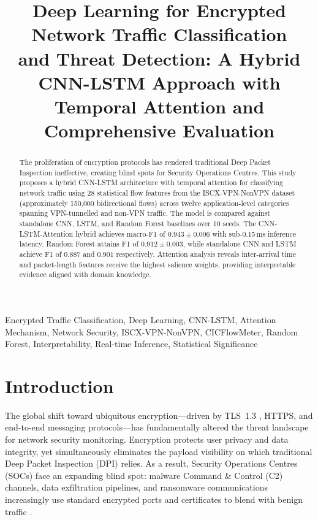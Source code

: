 \documentclass[conference]{IEEEtran}
\title{Deep Learning for Encrypted Network Traffic Classification\\
and Threat Detection: A Hybrid CNN-LSTM Approach with\\
Temporal Attention and Comprehensive Evaluation}
\author{
\IEEEauthorblockN{Avula Praveen Kumar}
\IEEEauthorblockA{Student ID: 24271730\\
H9AIMLC -- AI/ML in Cybersecurity\\
National College of Ireland\\
Dublin, Ireland\\
\texttt{24271730@student.ncirl.ie}}
}
\begin{document}
\maketitle

\begin{abstract}
The proliferation of encryption protocols has rendered traditional Deep Packet Inspection ineffective, creating blind spots for Security Operations Centres. This study proposes a hybrid CNN-LSTM architecture with temporal attention for classifying network traffic using 28 statistical flow features from the ISCX-VPN-NonVPN dataset (approximately 150,000 bidirectional flows) across twelve application-level categories spanning VPN-tunnelled and non-VPN traffic. The model is compared against standalone CNN, LSTM, and Random Forest baselines over 10 seeds. The CNN-LSTM-Attention hybrid achieves macro-F1 of $0.943 \pm 0.006$ with sub-0.15\,ms inference latency. Random Forest attains F1 of $0.912 \pm 0.003$, while standalone CNN and LSTM achieve F1 of $0.887$ and $0.901$ respectively. Attention analysis reveals inter-arrival time and packet-length features receive the highest salience weights, providing interpretable evidence aligned with domain knowledge.
\end{abstract}

\begin{IEEEkeywords}
Encrypted Traffic Classification, Deep Learning, CNN-LSTM, Attention Mechanism,
Network Security, ISCX-VPN-NonVPN, CICFlowMeter, Random Forest, Interpretability,
Real-time Inference, Statistical Significance
\end{IEEEkeywords}

\section{Introduction}
\label{sec:intro}

The global shift toward ubiquitous encryption---driven by TLS~1.3
\cite{rescorla2018tls}, HTTPS, and end-to-end messaging protocols---has
fundamentally altered the threat landscape for network security monitoring.
Encryption protects user privacy and data integrity, yet simultaneously
eliminates the payload visibility on which traditional Deep Packet Inspection
(DPI) relies. As a result, Security Operations Centres (SOCs) face an expanding
blind spot: malware Command \& Control (C2) channels, data exfiltration
pipelines, and ransomware communications increasingly use standard encrypted
ports and certificates to blend with benign traffic
\cite{rezaei2019,pacheco2019}.
\end{document}
